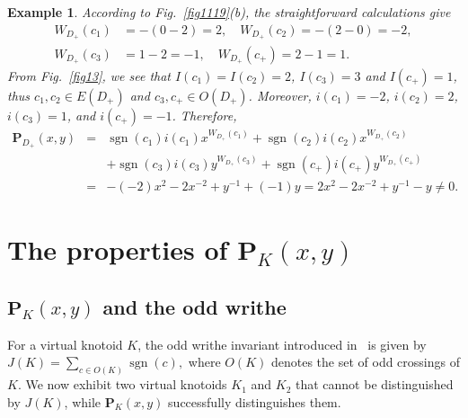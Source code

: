 \documentclass[12pt]{amsart}
\theoremstyle{noparens}
\newtheorem{example}{Example}[section]
\numberwithin{equation}{section}
\numberwithin{equation}{section}
\begin{document}
\begin{example}
{		According to Fig.~\ref{fig1119}(b), the straightforward calculations give
		$$
		\begin{aligned}
			W_{D_+}(c_1) &= -(0-2) = 2, \quad W_{D_+}(c_2) =-(2-0)= -2, \\ W_{D_+}(c_3) &=1-2= -1, \quad W_{D_+}(c_+) =2-1= 1.
		\end{aligned}
		$$ 
		From Fig.~\ref{fig13}, we see that $I(c_1)=I(c_2)=2$, $I(c_3)=3$ and $I(c_+)=1$, thus $c_1, c_2 \in E(D_+)$ and $c_3, c_+ \in O(D_+)$. Moreover, $i(c_1)=-2$, $i(c_2)=2$, $i(c_3)=1$, and $i(c_+)=-1$. Therefore, 
		\begin{eqnarray*}
			\mathbf{P}_{D_+}(x,y)&=&\operatorname{sgn}(c_1) i(c_1) x^{W_{D_+}(c_1)}+\operatorname{sgn}(c_2) i(c_2) x^{W_{D_+}(c_2)}\\
			&&+\operatorname{sgn}(c_3) i(c_3) y^{W_{D_+}(c_3)}+\operatorname{sgn}(c_+) i(c_+) y^{W_{D_+}(c_+)}\\
			&=& -(-2) x^{2}-2 x^{-2} + y^{-1} +(-1) y= 2x^2-2x^{-2}+y^{-1}-y \neq 0.
	\end{eqnarray*} }
\end{example} 

\section{The properties of $\mathbf{P}_K(x,y)$} \label{section3}


\subsection{$\mathbf{P}_K(x,y)$ and the odd writhe} \label{subsection3.0}

For a virtual knotoid $K$, the odd writhe invariant introduced in~\cite{GK} is given by
$
J(K)=\sum_{c\in O(K)}\operatorname{sgn}(c),
$
where $O(K)$ denotes the set of odd crossings of $K$. We now exhibit two virtual knotoids $K_1$ and $K_2$ that cannot be distinguished by $J(K)$, while $\mathbf{P}_K(x,y)$ successfully distinguishes them.
\end{document}
